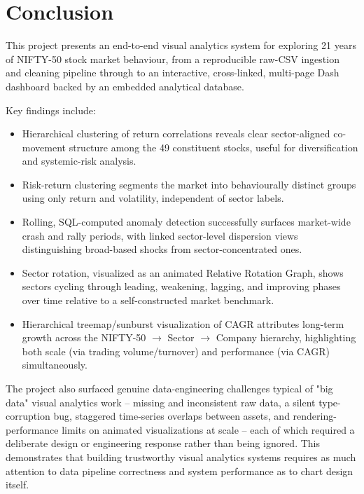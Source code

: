 \documentclass[14pt,a4paper]{extreport}
\begin{document}
\chapter{Conclusion}

This project presents an end-to-end visual analytics system for exploring
21 years of NIFTY-50 stock market behaviour, from a reproducible raw-CSV
ingestion and cleaning pipeline through to an interactive, cross-linked,
multi-page Dash dashboard backed by an embedded analytical database.

Key findings include:

\begin{itemize}
    \item Hierarchical clustering of return correlations reveals clear
        sector-aligned co-movement structure among the 49 constituent
        stocks, useful for diversification and systemic-risk analysis.
    \item Risk-return clustering segments the market into behaviourally
        distinct groups using only return and volatility, independent of
        sector labels.
    \item Rolling, SQL-computed anomaly detection successfully surfaces
        market-wide crash and rally periods, with linked sector-level
        dispersion views distinguishing broad-based shocks from
        sector-concentrated ones.
    \item Sector rotation, visualized as an animated Relative Rotation
        Graph, shows sectors cycling through leading, weakening, lagging,
        and improving phases over time relative to a self-constructed
        market benchmark.
    \item Hierarchical treemap/sunburst visualization of CAGR attributes
        long-term growth across the NIFTY-50 \(\rightarrow\) Sector
        \(\rightarrow\) Company hierarchy, highlighting both scale (via
        trading volume/turnover) and performance (via CAGR) simultaneously.
\end{itemize}

The project also surfaced genuine data-engineering challenges typical of
"big data" visual analytics work -- missing and inconsistent raw data,
a silent type-corruption bug, staggered time-series overlaps between
assets, and rendering-performance limits on animated visualizations at
scale -- each of which required a deliberate design or engineering
response rather than being ignored. This demonstrates that building
trustworthy visual analytics systems requires as much attention to data
pipeline correctness and system performance as to chart design itself.
\end{document}
